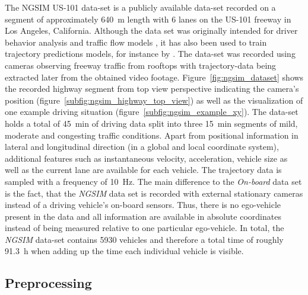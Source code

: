 The \ac{NGSIM} US-101 data-set \parencite{NGSIM-US101} is a publicly available data-set recorded on a segment of approximately \SI{640}{\meter} length with \num{6} lanes on the US-101 freeway in Los Angeles, California.
Although the data set was originally intended for driver behavior analysis and traffic flow models \parencite{He2017}, it has also been used to train trajectory predictions models, for instance by \textcite{Altche2018, Deo2018}.
The data-set was recorded using cameras observing freeway traffic from rooftops with trajectory-data being extracted later from the obtained video footage.
Figure~\ref{fig:ngsim_dataset} shows the recorded highway segment from top view perspective indicating the camera's position (figure~\ref{subfig:ngsim_highway_top_view}) as well as the visualization of one example driving situation (figure~\ref{subfig:ngsim_example_xy}).
The data-set holds a total of \SI{45}{\minute} of driving data split into three \SI{15}{\minute} segments of mild, moderate and congesting traffic conditions.
Apart from positional information in lateral and longitudinal direction (in a global and local coordinate system), additional features such as instantaneous velocity, acceleration, vehicle size as well as the current lane are available for each vehicle.
The trajectory data is sampled with a frequency of \SI{10}{\hertz}.
The main difference to the \emph{On-board} data set is the fact, that the \emph{\ac{NGSIM}} data set is recorded with external stationary cameras instead of a driving vehicle's on-board sensors.
Thus, there is no ego-vehicle present in the data and all information are available in absolute coordinates instead of being measured relative to one particular ego-vehicle.
In total, the \emph{\ac{NGSIM}} data-set contains \num{5930} vehicles and therefore a total time of roughly \SI{91.3}{\hour} when adding up the time each individual vehicle is visible.

\subsection{Preprocessing}
\label{subsec:preproc}

